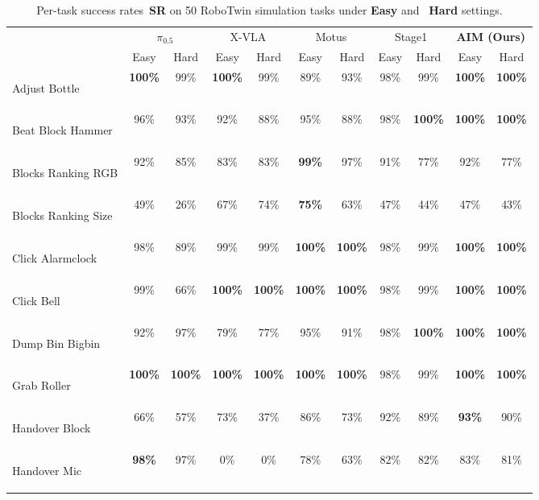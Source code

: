 \documentclass{article}
\newcommand{\bestcell}[1]{\cellcolor{bestlavender}\textbf{#1}}
\begin{document}
\begin{table}[htbp]
\centering
\captionsetup{font=small, labelfont=bf, skip=4pt}
\caption{Per-task success rates~\textbf{SR} on 50 RoboTwin simulation tasks under \textbf{Easy} and ~\textbf{Hard} settings.}
\label{tab:stage1-stage2-baselines-final}

\small
\setlength{\tabcolsep}{3.8pt}
\renewcommand{\arraystretch}{1.06}

\begin{tabular}{>{\itshape\raggedright\arraybackslash}p{3.35cm}cccccccccc}
\toprule
\multirow{2}{*}{Simulation Task}
& \multicolumn{2}{c}{$\pi_{0.5}$}
& \multicolumn{2}{c}{X-VLA}
& \multicolumn{2}{c}{Motus}
& \multicolumn{2}{c}{Stage1}
& \multicolumn{2}{c}{\textbf{AIM (Ours)}} \\
\cmidrule(lr){2-3}\cmidrule(lr){4-5}\cmidrule(lr){6-7}\cmidrule(lr){8-9}\cmidrule(lr){10-11}
& Easy & Hard
& Easy & Hard
& Easy & Hard
& Easy & Hard
& Easy & Hard \\
\midrule
Adjust Bottle & \bestcell{100\%} & 99\% & \bestcell{100\%} & 99\% & 89\% & 93\% & 98\% & 99\% & \bestcell{100\%} & \bestcell{100\%} \\
Beat Block Hammer & 96\% & 93\% & 92\% & 88\% & 95\% & 88\% & 98\% & \bestcell{100\%} & \bestcell{100\%} & \bestcell{100\%} \\
Blocks Ranking RGB & 92\% & 85\% & 83\% & 83\% & \bestcell{99\%} & 97\% & 91\% & 77\% & 92\% & 77\% \\
Blocks Ranking Size & 49\% & 26\% & 67\% & 74\% & \bestcell{75\%} & 63\% & 47\% & 44\% & 47\% & 43\% \\
Click Alarmclock & 98\% & 89\% & 99\% & 99\% & \bestcell{100\%} & \bestcell{100\%} & 98\% & 99\% & \bestcell{100\%} & \bestcell{100\%} \\
Click Bell & 99\% & 66\% & \bestcell{100\%} & \bestcell{100\%} & \bestcell{100\%} & \bestcell{100\%} & 98\% & 99\% & \bestcell{100\%} & \bestcell{100\%} \\
Dump Bin Bigbin & 92\% & 97\% & 79\% & 77\% & 95\% & 91\% & 98\% & \bestcell{100\%} & \bestcell{100\%} & \bestcell{100\%} \\
Grab Roller & \bestcell{100\%} & \bestcell{100\%} & \bestcell{100\%} & \bestcell{100\%} & \bestcell{100\%} & \bestcell{100\%} & 98\% & 99\% & \bestcell{100\%} & \bestcell{100\%} \\
Handover Block & 66\% & 57\% & 73\% & 37\% & 86\% & 73\% & 92\% & 89\% & \bestcell{93\%} & 90\% \\
Handover Mic & \bestcell{98\%} & 97\% & 0\% & 0\% & 78\% & 63\% & 82\% & 82\% & 83\% & 81\% \\

\end{tabular}
\end{table}
\end{document}
